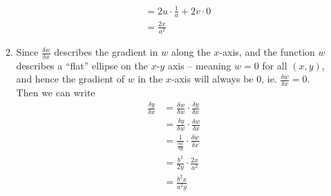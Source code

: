 \documentclass[10pt]{article}
\begin{document}
\begin{enumerate}
\begin{enumerate}
\begin{align*}
                                        &= 2u \cdot \frac{1}{a} + 2v \cdot 0 \\
                                        &= \frac{2x}{a^2}
                            \end{align*}
                        \item Since $\frac{\delta w}{\delta x}$ describes the
                            gradient in $w$ along the $x$-axis, and the
                            function $w$ describes a ``flat'' ellipse on the
                            $x$-$y$ axis -- meaning $w = 0$ for all $(x, y)$,
                            and hence the gradient of $w$ in the $x$-axis will
                            always be 0, ie. $\frac{\delta w}{\delta x} = 0$.
                            Then we can write 
                            \begin{align*}
                                \frac{\delta y}{\delta x} &= \frac{\delta w}{\delta w} \cdot \frac{\delta y}{\delta x} \\
                                &= \frac{\delta y}{\delta w} \cdot \frac{\delta w}{\delta x} \\
                                &= \frac{1}{\frac{\delta w}{\delta y}} \cdot \frac{\delta w}{\delta x} \\
                                &= \frac{b^2}{2y} \cdot \frac{2x}{a^2} \\
                                &= \frac{b^2x}{a^2y}
                            \end{align*}
                    \end{enumerate}
    \end{enumerate}
\end{document}
